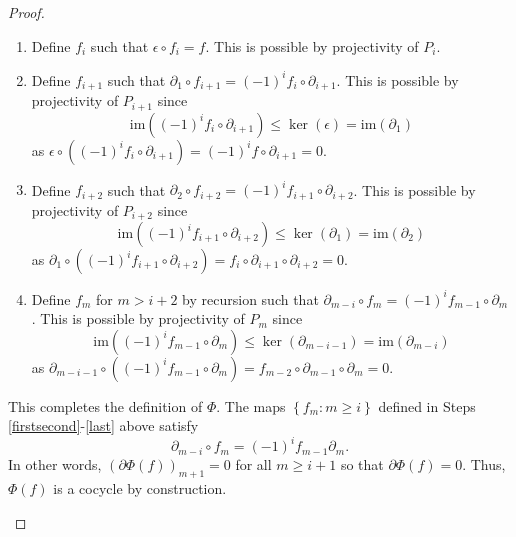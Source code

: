\documentclass[12pt]{article}
\newcounter{savedenumii}
\begin{document}
\begin{proof}
\begin{enumerate}
\begin{enumerate}
\item\label{first} Define $f_i$ such that $\epsilon\circ f_i=f$.
This is possible by projectivity of $P_i$.
\item\label{firstsecond} Define $f_{i+1}$ such that $\partial_1\circ f_{i+1}
=\left(-1\right)^i f_i\circ\partial_{i+1}$.
This is possible by projectivity of $P_{i+1}$ since
\[\mathrm{im}\left(\left(-1\right)^i f_i\circ\partial_{i+1}\right)
\le\ker\left(\epsilon\right)
=\mathrm{im}\left(\partial_1\right)\]
as $\epsilon\circ\left(\left(-1\right)^i f_i\circ\partial_{i+1}\right)
=\left(-1\right)^i f\circ\partial_{i+1}=0$.
\item Define $f_{i+2}$ such that $\partial_2\circ f_{i+2}
=\left(-1\right)^i f_{i+1}\circ\partial_{i+2}$.
This is possible by projectivity of $P_{i+2}$ since
\[\mathrm{im}\left(\left(-1\right)^i f_{i+1}\circ\partial_{i+2}\right)
\le\ker\left(\partial_1\right)
=\mathrm{im}\left(\partial_2\right)\]
as $\partial_1\circ\left(\left(-1\right)^i
f_{i+1}\circ\partial_{i+2}\right)
=f_i\circ\partial_{i+1}\circ\partial_{i+2}=0$.
\item\label{last} Define $f_m$ for $m>i+2$ by recursion
such that $\partial_{m-i}\circ f_m
=\left(-1\right)^i f_{m-1}\circ\partial_m$.
This is possible by projectivity of $P_m$ since
\[\mathrm{im}\left(\left(-1\right)^i f_{m-1}\circ\partial_m\right)
\le\ker\left(\partial_{m-i-1}\right)
=\mathrm{im}\left(\partial_{m-i}\right)\]
as $\partial_{m-i-1}\circ\left(\left(-1\right)^i
f_{m-1}\circ\partial_m\right)
=f_{m-2}\circ\partial_{m-1}\circ\partial_m=0$.
\setcounter{savedenumii}{\value{enumii}}
\end{enumerate}
This completes the definition of $\Phi$.
The maps $\left\{f_m:m\ge i\right\}$
defined in Steps \ref{firstsecond}-\ref{last} above satisfy
\[\partial_{m-i}\circ f_m=\left(-1\right)^i f_{m-1}\partial_m.\]
In other words, $\left(\partial \Phi\left(f\right)\right)_{m+1}=0$ for all $m\ge i+1$
so that $\partial\Phi\left(f\right)=0$.
Thus, $\Phi\left(f\right)$ is a cocycle by construction.


\end{enumerate}
\end{proof}
\end{document}
